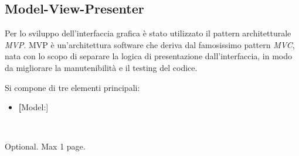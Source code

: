 \documentclass[12pt,a4paper,openright,twoside]{book}
\newcommand{\itemdef}[1]{\item \textbf{#1}}
\begin{document}
\subsection{Model-View-Presenter}

Per lo sviluppo dell'interfaccia grafica è stato utilizzato il pattern architetturale \textit{\gls{MVP}}.
\gls{MVP} è un'architettura software che deriva dal famosissimo pattern \textit{\gls{MVC}}, nata con lo scopo di separare la logica di presentazione dall'interfaccia, in modo da migliorare la manutenibilità e il testing del codice.

Si compone di tre elementi principali:

\begin{itemize}
	\itemdef[Model:]
\end{itemize}




\backmatter\




\begin{acknowledgements} %
Optional. Max 1 page.
\end{acknowledgements}
\end{document}
